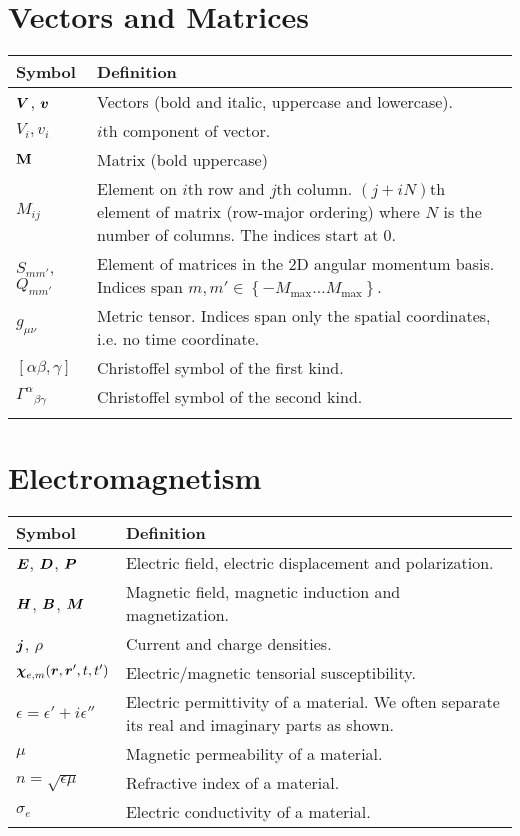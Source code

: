 \section*{Vectors and Matrices}
\begin{tabularx}{\textwidth}{lX}
  \hline\hline
  Symbol		& Definition	\\
  \hline\hline				
  $\boldsymbol{V}$, $\boldsymbol{v}$	& Vectors (bold and italic, uppercase and lowercase).	\\
  $V_i, v_i$		& $i$th component of vector.	\\
  $\mathbf{M}$		& Matrix (bold uppercase)	\\
  $M_{ij}$		& Element on $i$th row and $j$th column. $(j+iN)$th element of matrix (row-major ordering) 
			  where $N$ is the number of columns. The indices start at 0.\\
  $S_{mm'}$, $Q_{mm'}$	& Element of matrices in the 2D angular momentum basis. Indices span $m,m'\in\left\{-M_\text{max}\ldots M_\text{max}\right\}$.	\\
  $g_{\mu\nu}$		& Metric tensor. Indices span only the spatial coordinates, i.e. no time coordinate. \\
  $[\alpha\beta,\gamma]$& Christoffel symbol of the first kind.	\\
  ${\Gamma^{\alpha}}_{\beta\gamma}$
			& Christoffel symbol of the second kind. \\
  \hline\hline				\\
\end{tabularx}

\section*{Electromagnetism}
\begin{tabularx}{\textwidth}{lX}
 \hline\hline
 Symbol					& Definition 	\\
 \hline\hline
 $\boldsymbol{E}$, $\boldsymbol{D}$, $\boldsymbol{P}$		& Electric field, electric displacement and polarization.	\\
 $\boldsymbol{H}$, $\boldsymbol{B}$, $\boldsymbol{M}$		& Magnetic field, magnetic induction and magnetization.	\\
 $\boldsymbol{j}$, $\rho$			& Current and charge densities.	\\
 $\boldsymbol{\chi}_{e,m}(\boldsymbol{r},\boldsymbol{r}',t,t')$	& Electric/magnetic tensorial susceptibility. 	\\
 $\epsilon=\epsilon'+i\epsilon''$	& Electric permittivity of a material. We often separate its real and imaginary parts as shown.	\\
 $\mu$					& Magnetic permeability of a material. \\
 $n=\sqrt{\epsilon\mu}$			& Refractive index of a material. 	\\
 $\sigma_e$				& Electric conductivity of a material. \\
 
 \hline\hline
\end{tabularx}


